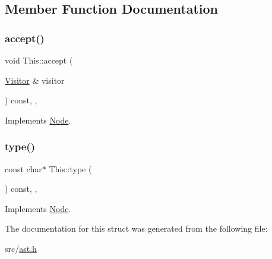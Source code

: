 \subsection{Member Function Documentation}
\mbox{\label{struct_this_a9ff113a898e7756ce6854c8167dddb15}} 
\subsubsection{\texorpdfstring{accept()}{accept()}}
{\footnotesize\ttfamily void This\+::accept (\begin{DoxyParamCaption}\item[{\hyperlink{struct_visitor}{Visitor} \&}]{visitor }\end{DoxyParamCaption}) const\hspace{0.3cm}{\ttfamily [inline]}, {\ttfamily [override]}, {\ttfamily [virtual]}}



Implements \hyperlink{struct_node_a10bd7af968140bbf5fa461298a969c71}{Node}.

\mbox{\label{struct_this_a124796ed69ea21377e84a4538c304b3a}} 
\subsubsection{\texorpdfstring{type()}{type()}}
{\footnotesize\ttfamily const char$\ast$ This\+::type (\begin{DoxyParamCaption}{ }\end{DoxyParamCaption}) const\hspace{0.3cm}{\ttfamily [inline]}, {\ttfamily [override]}, {\ttfamily [virtual]}}



Implements \hyperlink{struct_node_a82f29420d0a38efcc370352528e94e9b}{Node}.



The documentation for this struct was generated from the following file\+:\begin{DoxyCompactItemize}
\item 
src/\hyperlink{ast_8h}{ast.\+h}\end{DoxyCompactItemize}
